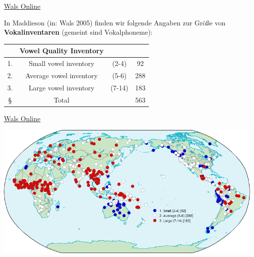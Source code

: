\documentclass[
]{article}
\begin{document}
\href{https://wals.info/}{Wals Online}

In Maddieson (in: Wals 2005) finden wir folgende Angaben zur Größe von
\textbf{Vokalinventaren} (gemeint sind Vokalphoneme):

\begin{longtable}[]{@{}cccc@{}}
\toprule
~ & \textbf{Vowel Quality Inventory} & ~ & ~ \\
\midrule
\endhead
1. & Small vowel inventory & (2-4) & 92 \\
2. & Average vowel inventory & (5-6) & 288 \\
3. & Large vowel inventory & (7-14) & 183 \\
§ & Total & ~ & 563 \\
\bottomrule
\end{longtable}

\href{https://wals.info/}{Wals Online}

\includegraphics[width=1\linewidth]{pictures/01b_NSG_Intro_2020-10-07/wals_vowel_inventories}

~
\end{document}
